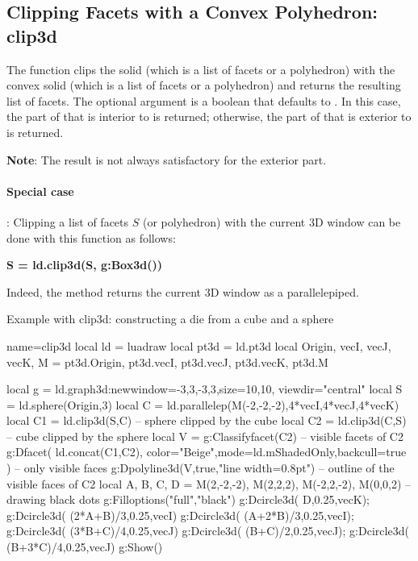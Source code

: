 \subsection{Clipping Facets with a Convex Polyhedron: clip3d}

The function  clips the solid  (which is a list of facets or a polyhedron) with the convex solid  (which is a list of facets or a polyhedron) and returns the resulting list of facets. The optional argument  is a boolean that defaults to \false. In this case, the part of  that is interior to  is returned; otherwise, the part of  that is exterior to  is returned.

\textbf{Note}: The result is not always satisfactory for the exterior part.

\paragraph{Special case}: Clipping a list of facets $S$ (or polyhedron) with the current 3D window can be done with this function as follows:

\begin{center}
\textbf{S = ld.clip3d(S, g:Box3d())}
\end{center}

Indeed, the  method returns the current 3D window as a parallelepiped.

\begin{demo}[clip3d]{Example with clip3d: constructing a die from a cube and a sphere}
\begin{luadraw}{name=clip3d}
local ld = luadraw
local pt3d = ld.pt3d
local Origin, vecI, vecJ, vecK, M = pt3d.Origin, pt3d.vecI, pt3d.vecJ, pt3d.vecK, pt3d.M

local g = ld.graph3d:new{window={-3,3,-3,3},size={10,10}, viewdir="central"}
local S = ld.sphere(Origin,3)
local C = ld.parallelep(M(-2,-2,-2),4*vecI,4*vecJ,4*vecK)
local C1 = ld.clip3d(S,C) -- sphere clipped by the cube
local C2 = ld.clip3d(C,S) -- cube clipped by the sphere
local V = g:Classifyfacet(C2) -- visible facets of C2
g:Dfacet( ld.concat(C1,C2), {color="Beige",mode=ld.mShadedOnly,backcull=true} ) -- only visible faces
g:Dpolyline3d(V,true,"line width=0.8pt") -- outline of the visible faces of C2
local A, B, C, D = M(2,-2,-2), M(2,2,2), M(-2,2,-2), M(0,0,2) -- drawing black dots
g:Filloptions("full","black")
g:Dcircle3d( D,0.25,vecK); g:Dcircle3d( (2*A+B)/3,0.25,vecI)
g:Dcircle3d( (A+2*B)/3,0.25,vecI); g:Dcircle3d( (3*B+C)/4,0.25,vecJ)
g:Dcircle3d( (B+C)/2,0.25,vecJ); g:Dcircle3d( (B+3*C)/4,0.25,vecJ)
g:Show()
\end{luadraw}
\end{demo}

